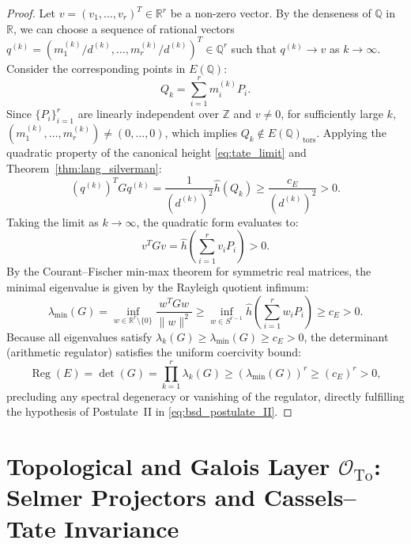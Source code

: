 \documentclass[11pt,reqno]{article}
\theoremstyle{plain}
\theoremstyle{definition}
\DeclareMathOperator{\Reg}{Reg}
\begin{document}
\begin{proof}
Let $v = (v_1, \dots, v_r)^T \in \mathbb{R}^r$ be a non-zero vector. By the denseness of $\mathbb{Q}$ in $\mathbb{R}$, we can choose a sequence of rational vectors $q^{(k)} = (m_1^{(k)}/d^{(k)}, \dots, m_r^{(k)}/d^{(k)})^T \in \mathbb{Q}^r$ such that $q^{(k)} \to v$ as $k \to \infty$. Consider the corresponding points in $E(\mathbb{Q})$:
\begin{equation}
    Q_k = \sum_{i=1}^r m_i^{(k)} P_i.
\end{equation}
Since $\{P_i\}_{i=1}^r$ are linearly independent over $\mathbb{Z}$ and $v \neq 0$, for sufficiently large $k$, $(m_1^{(k)}, \dots, m_r^{(k)}) \neq (0, \dots, 0)$, which implies $Q_k \notin E(\mathbb{Q})_{\mathrm{tors}}$. Applying the quadratic property of the canonical height \eqref{eq:tate_limit} and Theorem~\ref{thm:lang_silverman}:
\begin{equation}
    (q^{(k)})^T G q^{(k)} = \frac{1}{(d^{(k)})^2} \hat{h}(Q_k) \ge \frac{c_E}{(d^{(k)})^2} > 0.
\end{equation}
Taking the limit as $k \to \infty$, the quadratic form evaluates to:
\begin{equation}
    v^T G v = \hat{h}\left( \sum_{i=1}^r v_i P_i \right) > 0.
\end{equation}
By the Courant--Fischer min-max theorem for symmetric real matrices, the minimal eigenvalue is given by the Rayleigh quotient infimum:
\begin{equation}
    \lambda_{\min}(G) = \inf_{w \in \mathbb{R}^r \setminus \{0\}} \frac{w^T G w}{\|w\|^2} \ge \inf_{w \in S^{r-1}} \hat{h}\left( \sum_{i=1}^r w_i P_i \right) \ge c_E > 0.
\end{equation}
Because all eigenvalues satisfy $\lambda_k(G) \ge \lambda_{\min}(G) \ge c_E > 0$, the determinant (arithmetic regulator) satisfies the uniform coercivity bound:
\begin{equation}
    \Reg(E) = \det(G) = \prod_{k=1}^r \lambda_k(G) \ge (\lambda_{\min}(G))^r \ge (c_E)^r > 0,
\end{equation}
precluding any spectral degeneracy or vanishing of the regulator, directly fulfilling the hypothesis of Postulate~II in \eqref{eq:bsd_postulate_II}.
\end{proof}

\section{Topological and Galois Layer $\mathcal{O}_{\mathrm{To}}$: Selmer Projectors and Cassels--Tate Invariance}
\label{sec:topological}
\end{document}
